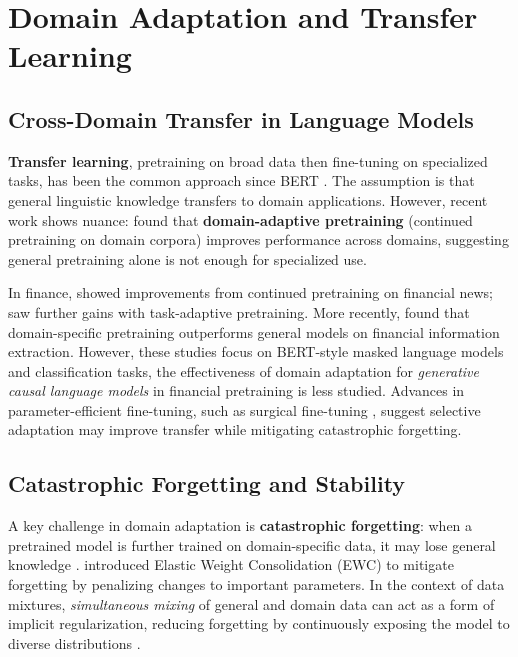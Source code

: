 \section{Domain Adaptation and Transfer Learning}

\subsection{Cross-Domain Transfer in Language Models}

\textbf{Transfer learning}, pretraining on broad data then fine-tuning on specialized tasks, has been the common approach since BERT \parencite{devlin2019bert,pan2010transfer,zhuang2020comprehensive}. The assumption is that general linguistic knowledge transfers to domain applications. However, recent work shows nuance: \textcite{gururangan2020don} found that \textbf{domain-adaptive pretraining} (continued pretraining on domain corpora) improves performance across domains, suggesting general pretraining alone is not enough for specialized use.

In finance, \textcite{araci2019finbert} showed improvements from continued pretraining on financial news; \textcite{yang2020finbert} saw further gains with task-adaptive pretraining. More recently, \textcite{huang2023finbert} found that domain-specific pretraining outperforms general models on financial information extraction. However, these studies focus on BERT-style masked language models and classification tasks, the effectiveness of domain adaptation for \textit{generative causal language models} in financial pretraining is less studied. Advances in parameter-efficient fine-tuning, such as surgical fine-tuning \parencite{lee2022surgical}, suggest selective adaptation may improve transfer while mitigating catastrophic forgetting.

\subsection{Catastrophic Forgetting and Stability}

A key challenge in domain adaptation is \textbf{catastrophic forgetting}: when a pretrained model is further trained on domain-specific data, it may lose general knowledge \parencite{mccloskey1989catastrophic, french1999catastrophic}. \textcite{kirkpatrick2017overcoming} introduced Elastic Weight Consolidation (EWC) to mitigate forgetting by penalizing changes to important parameters. In the context of data mixtures, \textit{simultaneous mixing} of general and domain data can act as a form of implicit regularization, reducing forgetting by continuously exposing the model to diverse distributions \parencite{arivazhagan2019massively,raffel2020exploring}.

